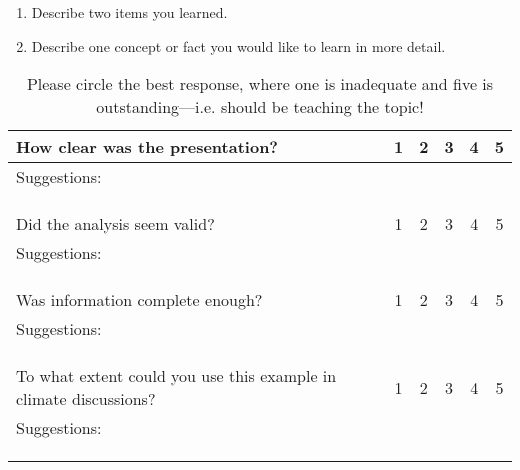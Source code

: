 \documentclass{article}\usepackage[]{graphicx}\usepackage[]{color}
\begin{document}
\begin{enumerate}
 \setlength\itemsep{4em}
  \item Describe two items you learned.
  \item Describe one concept or fact you would like to learn in more detail.
\end{enumerate}


\begin{table}[ht!]
\caption{Please circle the best response, where one is inadequate and five is outstanding---i.e. should be teaching the topic!}
\begin{tabular}{|p{4in}|ccccc|}\hline
How clear was the presentation?     & 1 & 2 & 3 & 4 & 5 \\ \hline
Suggestions: &&&&& \\ &&&&& \\ &&&&& \\
&&&&& \\ \hline
Did the analysis seem valid?        & 1 & 2 & 3 & 4 & 5 \\ \hline
Suggestions: &&&&& \\ &&&&& \\ &&&&& \\
&&&&& \\ \hline
Was information complete enough?            & 1 & 2 & 3 & 4 & 5 \\ \hline
Suggestions: &&&&& \\ &&&&& \\ &&&&& \\
&&&&& \\ \hline
To what extent could you use this example in climate discussions?            & 1 & 2 & 3 & 4 & 5 \\ \hline
Suggestions: &&&&& \\ &&&&& \\ &&&&& \\
&&&&& \\ \hline
\end{tabular}
\end{table}
\end{document}
